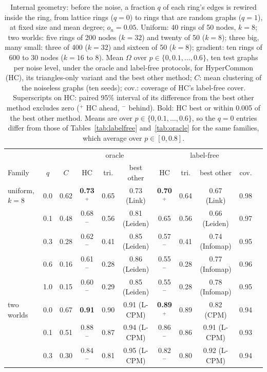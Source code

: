 \begin{table}[t]
\caption{Internal geometry: before the noise, a fraction $q$ of each ring's edges is rewired inside the ring, from lattice rings ($q=0$) to rings that are random graphs ($q=1$), at fixed size and mean degree; $o_n=0.05$. Uniform: 40 rings of 50 nodes, $k=8$; two worlds: five rings of 200 nodes ($k=32$) and twenty of 50 ($k=8$); three big, many small: three of 400 ($k=32$) and sixteen of 50 ($k=8$); gradient: ten rings of 600 to 30 nodes ($k=16$ to 8). Mean $\Omega$ over $p\in\{0,0.1,\dots,0.6\}$, ten test graphs per noise level, under the oracle and label-free protocols, for HyperCommon (HC), its triangles-only variant and the best other method; $C$: mean clustering of the noiseless graphs (ten seeds); cov.: coverage of HC's label-free cover. Superscripts on HC: paired 95\% interval of its difference from the best other method excludes zero ($^+$ HC ahead, $^-$ behind). Bold: HC best or within 0.005 of the best other method. Means are over $p\in\{0,0.1,\dots,0.6\}$, so the $q=0$ entries differ from those of Tables~\ref{tab:labelfree} and~\ref{tab:oracle} for the same families, which average over $p\in[0,0.8]$.}
\label{tab:geometry}
\footnotesize\setlength{\tabcolsep}{3pt}
\begin{ruledtabular}
\begin{tabular}{lcccccccccc}
 & & & \multicolumn{3}{c}{oracle} & \multicolumn{4}{c}{label-free} \\
Family & $q$ & $C$ & HC & tri. & best other & HC & tri. & best other & cov. \\
\hline
uniform, $k{=}8$ & 0.0 & 0.62 & \textbf{0.73$^+$} & 0.65 & 0.73 (Link) & \textbf{0.70$^+$} & 0.64 & 0.67 (Link) & 0.98 \\
 & 0.1 & 0.48 & 0.68$^-$ & 0.56 & 0.81 (Leiden) & 0.65 & 0.56 & 0.66 (Leiden) & 0.97 \\
 & 0.3 & 0.28 & 0.62$^-$ & 0.41 & 0.85 (Leiden) & 0.57$^-$ & 0.41 & 0.74 (Infomap) & 0.95 \\
 & 0.6 & 0.16 & 0.61$^-$ & 0.28 & 0.86 (Leiden) & 0.55$^-$ & 0.28 & 0.77 (Infomap) & 0.96 \\
 & 1.0 & 0.15 & 0.60$^-$ & 0.29 & 0.85 (Leiden) & 0.55$^-$ & 0.28 & 0.78 (Infomap) & 0.95 \\
\hline
two worlds & 0.0 & 0.67 & \textbf{0.91} & 0.90 & 0.91 (L-CPM) & \textbf{0.89$^+$} & 0.89 & 0.82 (CPM) & 0.94 \\
 & 0.1 & 0.51 & 0.88$^-$ & 0.87 & 0.94 (L-CPM) & 0.86$^-$ & 0.86 & 0.91 (L-CPM) & 0.93 \\
 & 0.3 & 0.30 & 0.84$^-$ & 0.81 & 0.95 (L-CPM) & 0.82$^-$ & 0.80 & 0.92 (L-CPM) & 0.94 \\

\end{tabular}
\end{ruledtabular}
\end{table}
